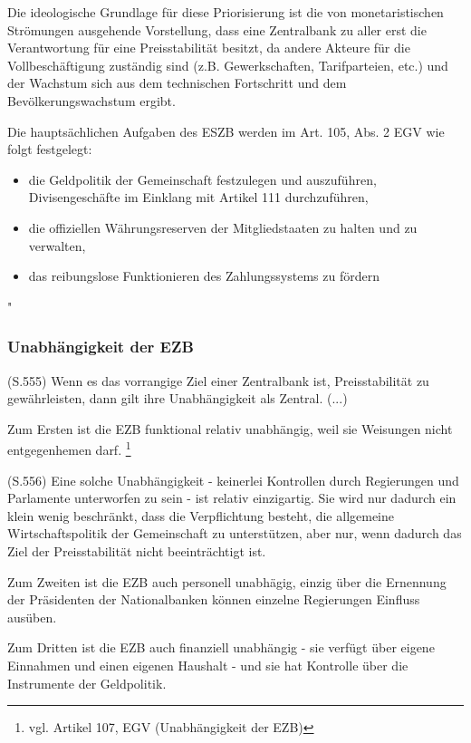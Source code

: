 \documentclass[
        onecolumn,
        a4paper,
        abstracton,
        parskip=half
        ,final
        ]{scrartcl}
\begin{document}
Die ideologische Grundlage f{\"u}r diese Priorisierung ist die von monetaristischen Str{\"o}mungen ausgehende Vorstellung, dass eine Zentralbank zu aller erst die Verantwortung f{\"u}r eine Preisstabilit{\"a}t besitzt, da andere Akteure f{\"u}r die Vollbesch{\"a}ftigung zust{\"a}ndig sind (z.B. Gewerkschaften, Tarifparteien, etc.) und der Wachstum sich aus dem technischen Fortschritt und dem Bev{\"o}lkerungswachstum ergibt.

Die haupts{\"a}chlichen Aufgaben des ESZB werden im Art. 105, Abs. 2 EGV wie folgt festgelegt:
\begin{itemize}
    \item{die Geldpolitik der Gemeinschaft festzulegen und auszuf{\"u}hren, Divisengesch{\"a}fte im Einklang mit Artikel 111 durchzuf{\"u}hren,}
    \item{die offiziellen W{\"a}hrungsreserven der Mitgliedstaaten zu halten und zu verwalten,}
    \item{das reibungslose Funktionieren des Zahlungssystems zu f{\"o}rdern}
\end{itemize} \citep[vgl.][S.555]{Basseler2010} "

\subsubsection{Unabh{\"a}ngigkeit der EZB}
(S.555)
Wenn es das vorrangige Ziel einer Zentralbank ist, Preisstabilit{\"a}t zu gew{\"a}hrleisten, dann gilt ihre Unabh{\"a}ngigkeit als Zentral. (...)

Zum Ersten ist die EZB funktional relativ unabh{\"a}ngig, weil sie Weisungen nicht entgegenhemen darf. \footnote[34]{vgl. Artikel 107, EGV (Unabh{\"a}ngigkeit der EZB)}

(S.556)
Eine solche Unabh{\"a}ngigkeit - keinerlei Kontrollen durch Regierungen und Parlamente unterworfen zu sein -  ist relativ einzigartig. Sie wird nur dadurch ein klein wenig beschr{\"a}nkt, dass die Verpflichtung besteht, die allgemeine Wirtschaftspolitik der Gemeinschaft zu unterst{\"u}tzen, aber nur, wenn dadurch das Ziel der Preisstabilit{\"a}t nicht beeintr{\"a}chtigt ist.

Zum Zweiten ist die EZB auch personell unabh{\"a}gig, einzig {\"u}ber die Ernennung der Pr{\"a}sidenten der Nationalbanken k{\"o}nnen einzelne Regierungen Einfluss aus{\"u}ben.

Zum Dritten ist die EZB auch finanziell unabh{\"a}ngig - sie verf{\"u}gt {\"u}ber eigene Einnahmen und einen eigenen Haushalt - und sie hat Kontrolle {\"u}ber die Instrumente der Geldpolitik.
\end{document}
